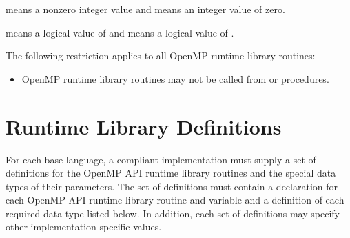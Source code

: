 \begin{samepage}
\begin{ccppspecific}
 means a nonzero integer value and  means 
an integer value of zero.
\end{ccppspecific}
\end{samepage}
\bigskip

\begin{samepage}
\begin{fortranspecific}
 means a logical value of  and  
means a logical value of .
\end{fortranspecific}
\end{samepage}
\bigskip

\begin{samepage}

\begin{fortranspecific}
\vspace{-3ex}  %
\restrictions
The following restriction applies to all OpenMP runtime library routines:

\begin{itemize}
\item OpenMP runtime library routines may not be called 
      from  or  procedures.
\end{itemize}
\end{fortranspecific}
\end{samepage}



\section{Runtime Library Definitions}
\label{sec:runtime library definitions}
For each base language, a compliant implementation must supply a set of 
definitions for the OpenMP API runtime library routines and the special 
data types of their parameters. The set of definitions must contain a 
declaration for each OpenMP API runtime library routine and variable and 
a definition of each required data type listed below. In addition, each 
set of definitions may specify other implementation specific values.

